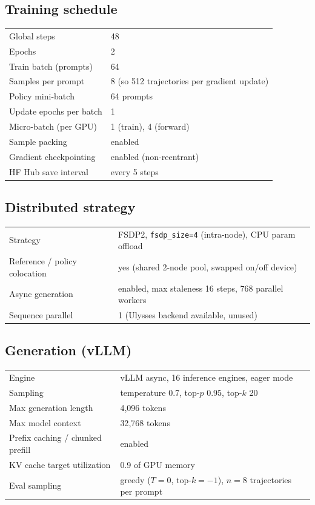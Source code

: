 \documentclass{llmxive}
\begin{document}
\subsection{Training schedule}

\begin{tabular}{ll}
\toprule
Global steps             & 48 \\
Epochs                   & 2 \\
Train batch (prompts)    & 64 \\
Samples per prompt       & 8 (so 512 trajectories per gradient update) \\
Policy mini-batch        & 64 prompts \\
Update epochs per batch  & 1 \\
Micro-batch (per GPU)    & 1 (train), 4 (forward) \\
Sample packing           & enabled \\
Gradient checkpointing   & enabled (non-reentrant) \\
HF Hub save interval     & every 5 steps \\
\bottomrule
\end{tabular}

\subsection{Distributed strategy}

\begin{tabular}{ll}
\toprule
Strategy                         & FSDP2, \texttt{fsdp\_size=4} (intra-node), CPU param offload \\
Reference / policy colocation    & yes (shared 2-node pool, swapped on/off device) \\
Async generation                 & enabled, max staleness 16 steps, 768 parallel workers \\
Sequence parallel                & 1 (Ulysses backend available, unused) \\
\bottomrule
\end{tabular}

\subsection{Generation (vLLM)}

\begin{tabular}{ll}
\toprule
Engine                          & vLLM async, 16 inference engines, eager mode \\
Sampling                        & temperature 0.7, top-$p$ 0.95, top-$k$ 20 \\
Max generation length           & 4{,}096 tokens \\
Max model context               & 32{,}768 tokens \\
Prefix caching / chunked prefill & enabled \\
KV cache target utilization     & 0.9 of GPU memory \\
Eval sampling                   & greedy ($T=0$, top-$k=-1$), $n=8$ trajectories per prompt \\
\bottomrule
\end{tabular}
\end{document}
